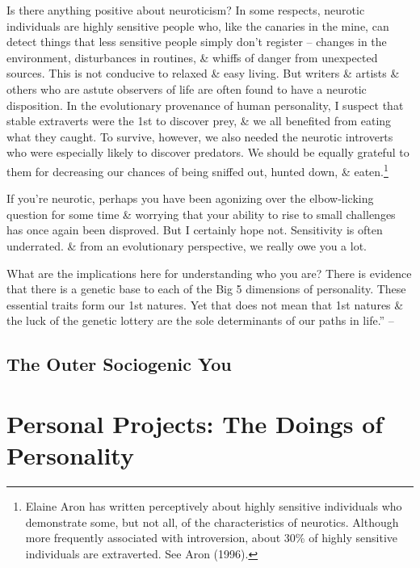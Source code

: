 \documentclass{article}
\numberwithin{equation}{section}
\begin{document}
Is there anything positive about neuroticism? In some respects, neurotic individuals are highly sensitive people who, like the canaries in the mine, can detect things that less sensitive people simply don't register -- changes in the environment, disturbances in routines, \& whiffs of danger from unexpected sources. This is not conducive to relaxed \& easy living. But writers \& artists \& others who are astute observers of life are often found to have a neurotic disposition. In the evolutionary provenance of human personality, I suspect that stable extraverts were the 1st to discover prey, \& we all benefited from eating what they caught. To survive, however, we also needed the neurotic introverts who were especially likely to discover predators. We should be equally grateful to them for decreasing our chances of being sniffed out, hunted down, \& eaten.\footnote{Elaine Aron has written perceptively about highly sensitive individuals who demonstrate some, but not all, of the characteristics of neurotics. Although more frequently associated with introversion, about 30\% of highly sensitive individuals are extraverted. See Aron (1996).}

If you're neurotic, perhaps you have been agonizing over the elbow-licking question for some time \& worrying that your ability to rise to small challenges has once again been disproved. But I certainly hope not. Sensitivity is often underrated. \& from an evolutionary perspective, we really owe you a lot.

What are the implications here for understanding who you are? There is evidence that there is a genetic base to each of the Big 5 dimensions of personality. These essential traits form our 1st natures. Yet that does not mean that 1st natures \& the luck of the genetic lottery are the sole determinants of our paths in life.'' -- \cite[pp. 19--20]{Little2017}

\subsection{The Outer Sociogenic You}


\section{Personal Projects: The Doings of Personality}


\end{document}
